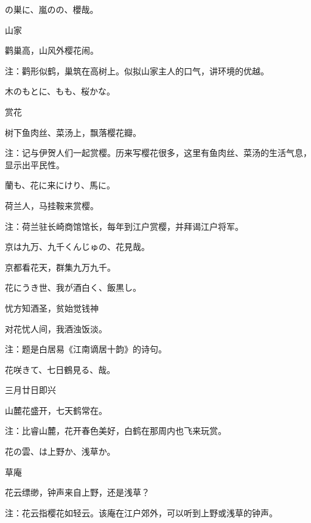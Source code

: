 \begin{haiku}
    {\FH {}の巣に、嵐のの、櫻哉。}

    {\FK 山家}

    {\FK 鹳巢高，山风外樱花闹。}

    {\FT 注：鹳形似鹤，巢筑在高树上。似拟山家主人的口气，讲环境的优越。}
\end{haiku}

\begin{haiku}
    {\FH 木のもとに、もも、桜かな。}

    {\FK 赏花}

    {\FK 树下鱼肉丝、菜汤上，飘落樱花瓣。}

    {\FT 注：记与伊贺人们一起赏樱。历来写樱花很多，这里有鱼肉丝、菜汤的生活气息，显示出平民性。}
\end{haiku}

\begin{haiku}
    {\FH {}蘭も、花に来にけり、馬に。}

    {\FK 荷兰人，马挂鞍来赏樱。}

    {\FT 注：荷兰驻长崎商馆馆长，每年到江户赏樱，并拜谒江户将军。}
\end{haiku}

\begin{haiku}
    {\FH 京は九万、九千くんじゅの、花見哉。}

    {\FK 京都看花天，群集九万九千。}
\end{haiku}

\begin{haiku}
    {\FH 花にうき世、我が酒白く、飯黒し。}

    {\FK 忧方知酒圣，贫始觉钱神}

    {\FK 对花忧人间，我酒浊饭淡。}

    {\FT 注：题是白居易《江南谪居十韵》的诗句。}
\end{haiku}

\begin{haiku}
    {\FH 花咲きて、七日鶴見る、哉。}

    {\FK 三月廿日即兴}

    {\FK 山麓花盛开，七天鹤常在。}

    {\FT 注：比睿山麓，花开春色美好，白鹤在那周内也飞来玩赏。}
\end{haiku}

\begin{haiku}
    {\FH 花の雲、は上野か、浅草か。}

    {\FK 草庵}

    {\FK 花云缥缈，钟声来自上野，还是浅草？}

    {\FT 注：花云指樱花如轻云。该庵在江户郊外，可以听到上野或浅草的钟声。}
\end{haiku}

